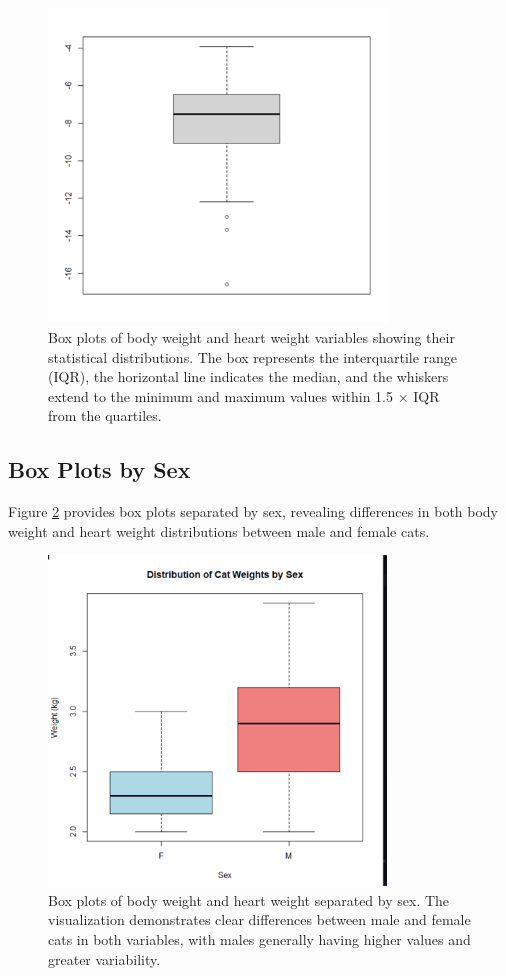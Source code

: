 \documentclass[a4paper,12pt]{article}
\begin{document}
\begin{figure}[H]
    \centering
    \includegraphics[width=0.8\textwidth]{boxplot.png}
    \caption{Box plots of body weight and heart weight variables showing their statistical distributions. The box represents the interquartile range (IQR), the horizontal line indicates the median, and the whiskers extend to the minimum and maximum values within 1.5 × IQR from the quartiles.}
    \label{fig:boxplot}
\end{figure}

\subsection{Box Plots by Sex}
\label{subsec:sex_bp}

Figure \ref{fig:boxplotbysex} provides box plots separated by sex, revealing differences in both body weight and heart weight distributions between male and female cats.

\begin{figure}[H]
    \centering
    \includegraphics[width=0.8\textwidth]{boxplotbysex.png}
    \caption{Box plots of body weight and heart weight separated by sex. The visualization demonstrates clear differences between male and female cats in both variables, with males generally having higher values and greater variability.}
    \label{fig:boxplotbysex}
\end{figure}
\end{document}
